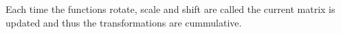 % 
% 
% 
% 
% 
% 
% 

Each time the functions {\ff rotate}, {\ff scale} and {\ff shift} are
called the current {\ff matrix} is updated and thus the transformations
are cummulative.

